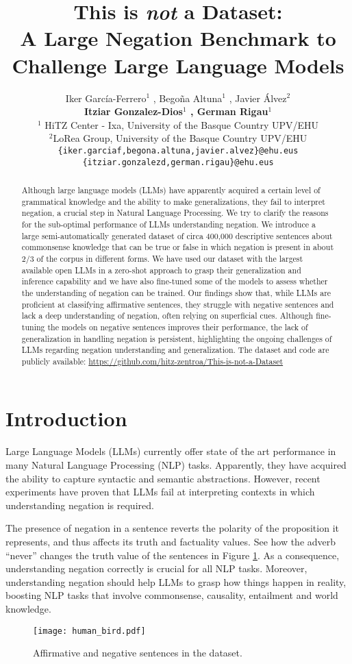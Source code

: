 \documentclass[11pt]{article}
\title{This is \textit{not} a Dataset: \\ A Large Negation Benchmark to Challenge Large Language Models}
\author{Iker García-Ferrero$^1$ , Bego\~{n}a Altuna$^1$ , Javier \'{A}lvez$^2$ \\ \textbf{Itziar Gonzalez-Dios$^1$ , German Rigau$^1$}  \\
$^1$ HiTZ Center - Ixa, University of the Basque Country UPV/EHU \\
$^2$LoRea Group, University of the Basque Country UPV/EHU \\
\texttt{\{iker.garciaf,begona.altuna,javier.alvez\}@ehu.eus} \\
  \texttt{\{itziar.gonzalezd,german.rigau\}@ehu.eus} \\
}
\begin{document}
\maketitle
\begin{abstract}

Although large language models (LLMs) have apparently acquired a certain level of grammatical knowledge and the ability to make generalizations, they fail to interpret negation, a crucial step in Natural Language Processing. We try to clarify the reasons for the sub-optimal performance of LLMs understanding negation. We introduce a large semi-automatically generated dataset of circa 400,000 descriptive sentences about commonsense knowledge that can be true or false in which negation is present in about 2/3 of the corpus in different forms. 
We have used our dataset with the largest available open LLMs in a zero-shot approach to grasp their generalization and inference capability and we have also fine-tuned some of the models to assess whether the understanding of negation can be trained. Our findings show that, while LLMs are proficient at classifying affirmative sentences, they struggle with negative sentences and lack a deep understanding of negation, often relying on superficial cues. Although fine-tuning the models on negative sentences improves their performance, the lack of generalization in handling negation is persistent, highlighting the ongoing challenges of LLMs regarding negation understanding and generalization.
The dataset and code are publicly available: \url{https://github.com/hitz-zentroa/This-is-not-a-Dataset}
\end{abstract}

\section{Introduction}

Large Language Models (LLMs) currently offer state of the art performance in many Natural Language Processing (NLP) tasks. Apparently, they have acquired the ability to capture syntactic \cite{Baroni2020} and semantic \cite{furrer2021compositional} abstractions. However, recent experiments \cite{kassner-schutze-2020-negated,hossain-etal-2020-analysis,truong2022} have proven that LLMs fail at interpreting contexts in which understanding negation is required.

The presence of negation in a sentence reverts the polarity of the proposition it represents, and thus affects its truth and factuality values. See how the adverb ``never'' changes the truth value of the sentences in Figure \ref{fig:example}. As a consequence, understanding negation correctly is crucial for all NLP tasks. Moreover, understanding negation should help LLMs to grasp how things happen in reality, boosting NLP tasks that involve commonsense, causality, entailment and world knowledge. \begin{figure}[t]
\centering
\texttt{[image: human\_bird.pdf]}
\caption{Affirmative and negative sentences in the dataset.}
\label{fig:example}
\end{figure}
\end{document}
